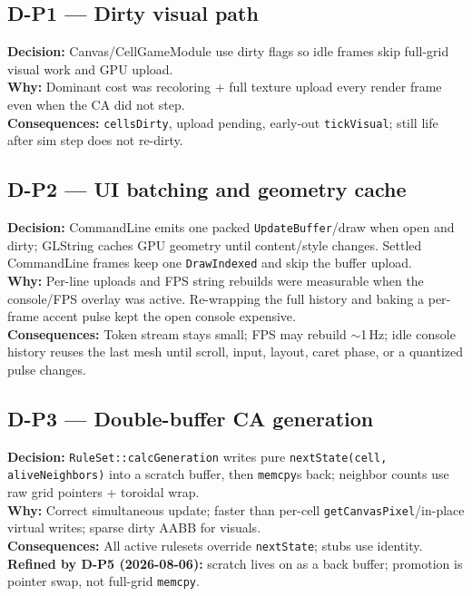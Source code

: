 \subsection*{D-P1 --- Dirty visual path}
\begin{decisionbox}[title={D-P1 \quad 2026-07-28}]
\textbf{Decision:} Canvas/CellGameModule use dirty flags so idle frames skip
full-grid visual work and GPU upload.\\
\textbf{Why:} Dominant cost was recoloring + full texture upload every render
frame even when the CA did not step.\\
\textbf{Consequences:} \texttt{cellsDirty}, upload pending, early-out
\texttt{tickVisual}; still life after sim step does not re-dirty.
\end{decisionbox}

\subsection*{D-P2 --- UI batching and geometry cache}
\begin{decisionbox}[title={D-P2 \quad 2026-07-28}]
\textbf{Decision:} CommandLine emits one packed \texttt{UpdateBuffer}/draw when
open and dirty; GLString caches GPU geometry until content/style changes.
Settled CommandLine frames keep one \texttt{DrawIndexed} and skip the buffer
upload.\\
\textbf{Why:} Per-line uploads and FPS string rebuilds were measurable when the
console/FPS overlay was active. Re-wrapping the full history and baking a
per-frame accent pulse kept the open console expensive.\\
\textbf{Consequences:} Token stream stays small; FPS may rebuild $\sim$1\,Hz;
idle console history reuses the last mesh until scroll, input, layout, caret
phase, or a quantized pulse changes.
\end{decisionbox}

\subsection*{D-P3 --- Double-buffer CA generation}
\begin{decisionbox}[title={D-P3 \quad 2026-07-28}]
\textbf{Decision:} \texttt{RuleSet::calcGeneration} writes pure
\texttt{nextState(cell, aliveNeighbors)} into a scratch buffer, then
\texttt{memcpy}s back; neighbor counts use raw grid pointers + toroidal wrap.\\
\textbf{Why:} Correct simultaneous update; faster than per-cell
\texttt{getCanvasPixel}/in-place virtual writes; sparse dirty AABB for visuals.\\
\textbf{Consequences:} All active rulesets override \texttt{nextState}; stubs
use identity.\\
\textbf{Refined by D-P5 (2026-08-06):} scratch lives on 
as a back buffer; promotion is pointer swap, not full-grid \texttt{memcpy}.
\end{decisionbox}

